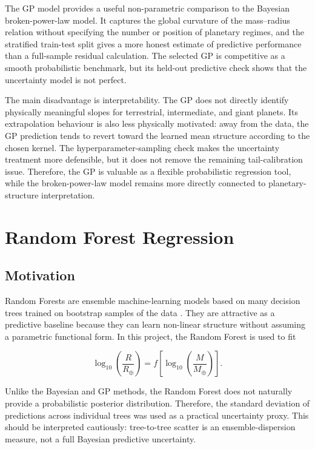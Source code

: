 \documentclass{article}
\numberwithin{equation}{section}
\begin{document}
The GP model provides a useful non-parametric comparison to the Bayesian broken-power-law model. It captures the global curvature of the mass--radius relation without specifying the number or position of planetary regimes, and the stratified train-test split gives a more honest estimate of predictive performance than a full-sample residual calculation. The selected GP is competitive as a smooth probabilistic benchmark, but its held-out predictive check shows that the uncertainty model is not perfect.

The main disadvantage is interpretability. The GP does not directly identify physically meaningful slopes for terrestrial, intermediate, and giant planets. Its extrapolation behaviour is also less physically motivated: away from the data, the GP prediction tends to revert toward the learned mean structure according to the chosen kernel. The hyperparameter-sampling check makes the uncertainty treatment more defensible, but it does not remove the remaining tail-calibration issue. Therefore, the GP is valuable as a flexible probabilistic regression tool, while the broken-power-law model remains more directly connected to planetary-structure interpretation.

\section{Random Forest Regression}

\subsection{Motivation}

Random Forests are ensemble machine-learning models based on many decision trees trained on bootstrap samples of the data \cite{breiman2001random}. They are attractive as a predictive baseline because they can learn non-linear structure without assuming a parametric functional form. In this project, the Random Forest is used to fit

\begin{equation}
\log_{10}\left(\frac{R}{R_\oplus}\right)
=
f\left[
\log_{10}\left(\frac{M}{M_\oplus}\right)
\right].
\end{equation}

Unlike the Bayesian and GP methods, the Random Forest does not naturally provide a probabilistic posterior distribution. Therefore, the standard deviation of predictions across individual trees was used as a practical uncertainty proxy. This should be interpreted cautiously: tree-to-tree scatter is an ensemble-dispersion measure, not a full Bayesian predictive uncertainty.
\end{document}
